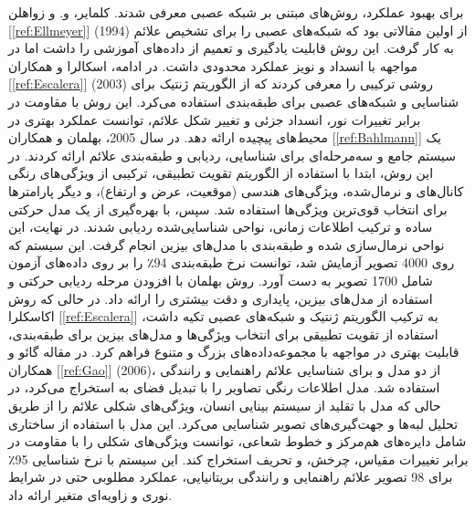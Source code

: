 برای بهبود عملکرد، روش‌های مبتنی بر شبکه عصبی معرفی شدند. کلمایر، و. و زواهلن [\ref{ref:Ellmeyer}] (1994) از اولین مقالاتی بود که شبکه‌های عصبی را برای تشخیص علائم به کار گرفت. این روش قابلیت یادگیری و تعمیم از داده‌های آموزشی را داشت اما در مواجهه با انسداد و نویز عملکرد محدودی داشت. در ادامه، اسکالرا و همکاران [\ref{ref:Escalera}] (2003) روشی ترکیبی را معرفی کردند که از الگوریتم ژنتیک برای شناسایی و شبکه‌های عصبی برای طبقه‌بندی استفاده می‌کرد. این روش با مقاومت در برابر تغییرات نور، انسداد جزئی و تغییر شکل علائم، توانست عملکرد بهتری در محیط‌های پیچیده ارائه دهد.
در سال 2005، بهلمان و همکاران [\ref{ref:Bahlmann}] یک سیستم جامع و سه‌مرحله‌ای برای شناسایی، ردیابی و طبقه‌بندی علائم ارائه کردند. در این روش، ابتدا با استفاده از الگوریتم تقویت تطبیقی، ترکیبی از ویژگی‌های رنگی کانال‌های  و نرمال‌شده، ویژگی‌های هندسی (موقعیت، عرض و ارتفاع)، و دیگر پارامترها برای انتخاب قوی‌ترین ویژگی‌ها استفاده شد. سپس، با بهره‌گیری از یک مدل حرکتی ساده و ترکیب اطلاعات زمانی، نواحی شناسایی‌شده ردیابی شدند. در نهایت، این نواحی نرمال‌سازی شده و طبقه‌بندی با مدل‌های بیزین انجام گرفت. این سیستم که روی 4000 تصویر آزمایش شد، توانست نرخ طبقه‌بندی 94٪ را بر روی داده‌های آزمون شامل 1700 تصویر به دست آورد. روش بهلمان با افزودن مرحله ردیابی حرکتی و استفاده از مدل‌های بیزین، پایداری و دقت بیشتری را ارائه داد. در حالی که روش اکاسکلرا [\ref{ref:Escalera}] به ترکیب الگوریتم ژنتیک و شبکه‌های عصبی تکیه داشت، استفاده از تقویت تطبیقی برای انتخاب ویژگی‌ها و مدل‌های بیزین برای طبقه‌بندی، قابلیت بهتری در مواجهه با مجموعه‌داده‌های بزرگ و متنوع فراهم کرد.
در مقاله گائو و همکاران [\ref{ref:Gao}] (2006)، از دو مدل  و  برای شناسایی علائم راهنمایی و رانندگی استفاده شد. مدل  اطلاعات رنگی تصاویر را با تبدیل فضای  به  استخراج می‌کرد، در حالی که مدل  با تقلید از سیستم بینایی انسان، ویژگی‌های شکلی علائم را از طریق تحلیل لبه‌ها و جهت‌گیری‌های تصویر شناسایی می‌کرد. این مدل با استفاده از ساختاری شامل دایره‌های هم‌مرکز و خطوط شعاعی، توانست ویژگی‌های شکلی را با مقاومت در برابر تغییرات مقیاس، چرخش، و تحریف استخراج کند. این سیستم با نرخ شناسایی 95٪ برای 98 تصویر علائم راهنمایی و رانندگی بریتانیایی، عملکرد مطلوبی حتی در شرایط نوری و زاویه‌ای متغیر ارائه داد.

